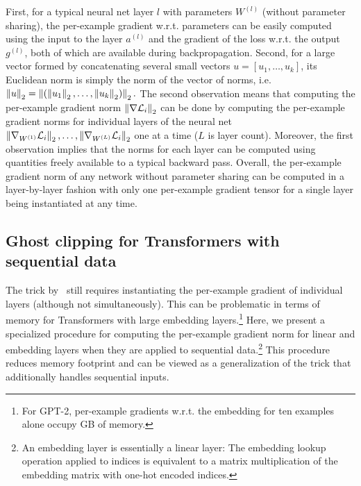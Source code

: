 First, for a typical neural net layer $l$ with parameters $W^{(l)}$ (without parameter sharing), the per-example gradient w.r.t. parameters can be easily computed using the input to the layer $a^{(l)}$ and the gradient of the loss w.r.t. the output $g^{(l)}$, both of which are available during backpropagation. 
Second, for a large vector formed by concatenating several small vectors $u = [u_1, \dots, u_k]$, its Euclidean norm is simply the norm of the vector of norms, i.e. 
$
\left\lVert u \right\rVert_2 =
    \left\lVert ( \left\lVert u_1\right\rVert_2, \dots, \left\lVert u_k\right\rVert_2 ) \right\rVert_2. 
$
The second observation means that computing the per-example gradient norm $\left\lVert\nabla  \mathcal{L}_i\right\rVert_2$ can be done by computing the per-example gradient norms for individual layers of the neural net $\left\lVert\nabla_{W^{(1)}}  \mathcal{L}_i\right\rVert_2, \dots, \left\lVert\nabla_{W^{(L)}}  \mathcal{L}_i\right\rVert_2$ one at a time ($L$ is layer count). 
Moreover, the first observation implies that the norms for each layer can be computed using quantities freely available to a typical backward pass.
Overall, the per-example gradient norm of any network without parameter sharing can be computed in a layer-by-layer fashion with only one per-example gradient tensor for a single layer being instantiated at any time. 




\subsection{Ghost clipping for Transformers with sequential data}\label{sec:our_ghost}
The trick by~\cite{lee2020scaling} still requires instantiating the per-example gradient of individual layers (although not simultaneously). 
This can be problematic in terms of memory for Transformers with large embedding layers.\footnote{
	For GPT-2, per-example gradients w.r.t. the embedding for ten examples alone occupy GB of memory.
} 
Here, we present a specialized procedure for computing the per-example gradient norm for linear and embedding layers when they are applied to sequential data.\footnote{An embedding layer is essentially a linear layer: The embedding lookup operation applied to indices is equivalent to a matrix multiplication of the embedding matrix with one-hot encoded indices.}
This procedure reduces memory footprint and can be viewed as a generalization of the \cite{goodfellow2015efficient} trick that additionally handles sequential inputs. 

